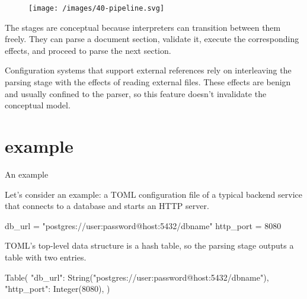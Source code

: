 \documentclass{article}
\begin{document}
\begin{figure}[grayscale-diagram]
\texttt{[image: /images/40-pipeline.svg]}
\end{figure}


The stages are conceptual because interpreters can transition between them freely.
They can parse a document section, validate it, execute the corresponding effects, and proceed to parse the next section.

Configuration systems that support external references rely on interleaving the parsing stage with the effects of reading external files.
These effects are benign and usually confined to the parser, so this feature doesn’t invalidate the conceptual model.

\section{example}{An example}

Let’s consider an example: a TOML configuration file of a typical backend service that connects to a database and starts an HTTP server.

\begin{code}[toml]
db_url = "postgres://user:password@host:5432/dbname"
http_port = 8080
\end{code}

TOML’s top-level data structure is a hash table, so the parsing stage outputs a table with two entries.

\begin{code}
Table({
  "db_url": String("postgres://user:password@host:5432/dbname"),
  "http_port": Integer(8080),
})
\end{code}
\end{document}
